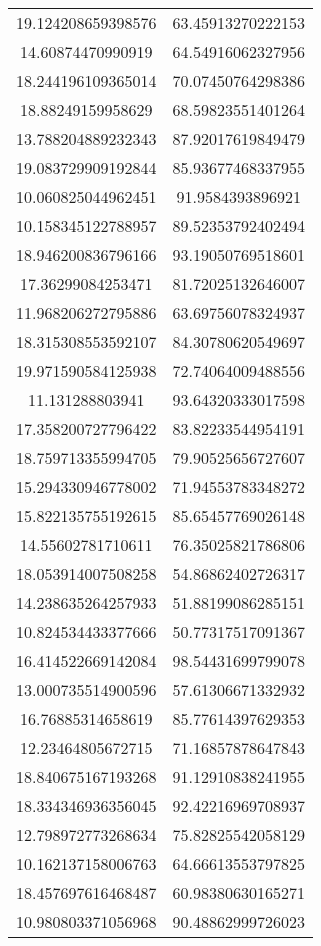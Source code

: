 \begin{table}
\begin{tabular}{cc}
19.124208659398576 & 63.45913270222153 \\
14.60874470990919 & 64.54916062327956 \\
18.244196109365014 & 70.07450764298386 \\
18.88249159958629 & 68.59823551401264 \\
13.788204889232343 & 87.92017619849479 \\
19.083729909192844 & 85.93677468337955 \\
10.060825044962451 & 91.9584393896921 \\
10.158345122788957 & 89.52353792402494 \\
18.946200836796166 & 93.19050769518601 \\
17.36299084253471 & 81.72025132646007 \\
11.968206272795886 & 63.69756078324937 \\
18.315308553592107 & 84.30780620549697 \\
19.971590584125938 & 72.74064009488556 \\
11.131288803941 & 93.64320333017598 \\
17.358200727796422 & 83.82233544954191 \\
18.759713355994705 & 79.90525656727607 \\
15.294330946778002 & 71.94553783348272 \\
15.822135755192615 & 85.65457769026148 \\
14.55602781710611 & 76.35025821786806 \\
18.053914007508258 & 54.86862402726317 \\
14.238635264257933 & 51.88199086285151 \\
10.824534433377666 & 50.77317517091367 \\
16.414522669142084 & 98.54431699799078 \\
13.000735514900596 & 57.61306671332932 \\
16.76885314658619 & 85.77614397629353 \\
12.23464805672715 & 71.16857878647843 \\
18.840675167193268 & 91.12910838241955 \\
18.334346936356045 & 92.42216969708937 \\
12.798972773268634 & 75.82825542058129 \\
10.162137158006763 & 64.66613553797825 \\
18.457697616468487 & 60.98380630165271 \\
10.980803371056968 & 90.48862999726023 \\

\end{tabular}
\end{table}
